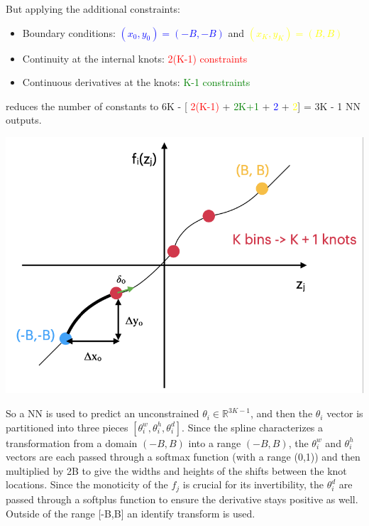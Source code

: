 \begin{minipage}{0.5\textwidth}

 But applying the additional constraints:

\begin{itemize}
	\item Boundary conditions: \textcolor{blue}{$(x_0, y_0) = (-B,-B)$} and \textcolor{yellow}{$(x_K,y_K) = (B,B)$}
	\item Continuity at the internal knots: \textcolor{red}{2(K-1) constraints}
	\item Continuous derivatives at the knots: \textcolor{green}{K-1 constraints}
\end{itemize}

reduces the number of constants to 6K - [ \textcolor{red}{2(K-1)} + \textcolor{green}{2K+1} + \textcolor{blue}{2} + \textcolor{yellow}{2}] = 3K - 1 NN outputs.

\end{minipage}
\hspace{0.05\textwidth}
\begin{minipage}{0.4\textwidth}
\includegraphics[trim={0 0 1cm 0},width=\textwidth]{figures/flows/flow-architectures/nsf-graphic}
\label{fig:nsf-graphic}
\end{minipage}

So a NN is used to predict an unconstrained $\theta_i \in \mathbb{R}^{3K - 1}$, and then the $\theta_i$ vector is partitioned into three pieces $[\theta_i^w, \theta_i^h, \theta_i^d]$. Since the spline characterizes a transformation from a domain $(-B,B)$ into a range $(-B,B)$, the $\theta_i^w$ and $\theta_i^h$ vectors are each passed through a softmax function (with a range (0,1)) and then multiplied by 2B to give the widths and heights of the shifts between the knot locations.
Since the monoticity of the $f_j$ is crucial for its invertibility, the $\theta_i^d$ are passed through a softplus function to ensure the derivative stays positive as well.
Outside of the range [-B,B] an identify transform is used.

